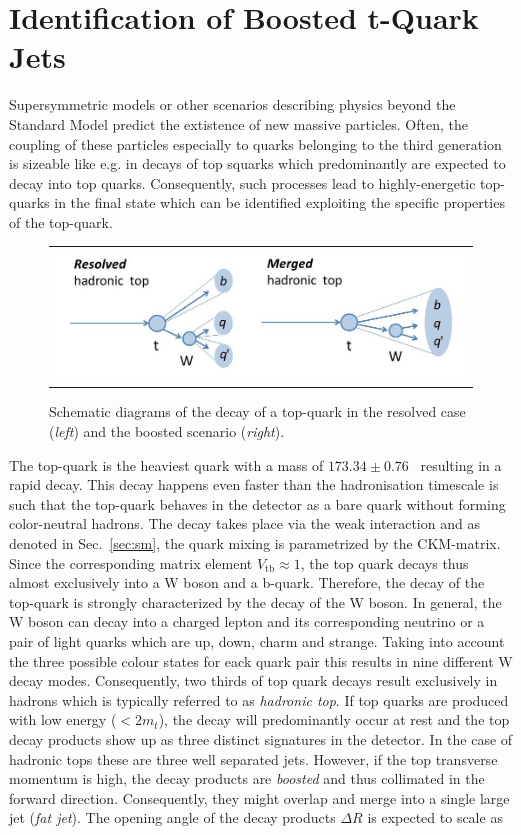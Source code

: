 \section{Identification of Boosted t-Quark Jets }
\label{sec:boosted_tops}
Supersymmetric models or other scenarios describing physics beyond the Standard Model predict the extistence of new massive particles. Often, the coupling of these particles especially to quarks belonging to the third generation is sizeable like e.g. in decays of top squarks which predominantly are expected to decay into top quarks. Consequently, such processes lead to highly-energetic top-quarks in the final state which can be identified exploiting the specific properties of the top-quark. \\
\begin{figure}[!tp]
  \centering 
  \begin{tabular}{c}
    \includegraphics[width=1.0\textwidth]{figures/BoostedTops.jpg} 
  \end{tabular}
  \caption{Schematic diagrams of the decay of a top-quark in the resolved case (\textit{left}) and the boosted scenario (\textit{right}).}
  \label{fig:boosted_top}
\end{figure}
The top-quark is the heaviest quark with a mass of $173.34 \pm 0.76$\gev~\cite{ATLAS:2014wva} resulting in a rapid decay. This decay happens even faster than the hadronisation timescale is such that the top-quark behaves in the detector as a bare quark without forming color-neutral hadrons. The decay takes place via the weak interaction and as denoted in Sec.~\ref{sec:sm}, the quark mixing is parametrized by the CKM-matrix. Since the corresponding matrix element $V_{\mathrm{tb}} \approx 1$, the top quark decays thus almost exclusively into a W boson and a b-quark. Therefore, the decay of the top-quark is strongly characterized by the decay of the W boson. In general, the W boson can decay into a charged lepton and its corresponding neutrino or a pair of light quarks which are up, down, charm and strange. Taking into account the three possible colour states for eack quark pair this results in nine different W decay modes. Consequently, two thirds of top quark decays result exclusively in hadrons which is typically referred to as \textit{hadronic top}. If top quarks are produced with low energy ($< 2 m_{t}$), the decay will predominantly occur at rest and the top decay products show up as three distinct signatures in the detector. In the case of hadronic tops these are three well separated jets. However, if the top transverse momentum is high, the decay products are \textit{boosted} and thus collimated in the forward direction. Consequently, they might overlap and merge into a single large jet (\textit{fat jet}). The opening angle of the decay products $\Delta R$ is expected to scale as
